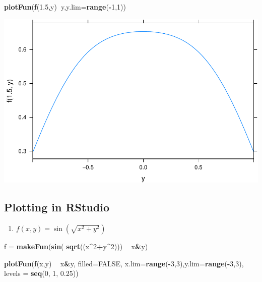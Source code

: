 \documentclass[
]{book}
\newenvironment{Shaded}{\begin{snugshade}}{\end{snugshade}}
\newcommand{\DataTypeTok}[1]{\textcolor[rgb]{0.13,0.29,0.53}{#1}}
\newcommand{\DecValTok}[1]{\textcolor[rgb]{0.00,0.00,0.81}{#1}}
\newcommand{\FloatTok}[1]{\textcolor[rgb]{0.00,0.00,0.81}{#1}}
\newcommand{\KeywordTok}[1]{\textcolor[rgb]{0.13,0.29,0.53}{\textbf{#1}}}
\newcommand{\NormalTok}[1]{#1}
\newcommand{\OperatorTok}[1]{\textcolor[rgb]{0.81,0.36,0.00}{\textbf{#1}}}
\newcommand{\OtherTok}[1]{\textcolor[rgb]{0.56,0.35,0.01}{#1}}
\newcommand{\StringTok}[1]{\textcolor[rgb]{0.31,0.60,0.02}{#1}}
\providecommand{\tightlist}{%
  \setlength{\itemsep}{0pt}\setlength{\parskip}{0pt}}
\begin{document}
\begin{Shaded}
\begin{Highlighting}[]
\KeywordTok{plotFun}\NormalTok{(}\KeywordTok{f}\NormalTok{(}\FloatTok{1.5}\NormalTok{,y)}\OperatorTok{~}\NormalTok{y,}\DataTypeTok{y.lim=}\KeywordTok{range}\NormalTok{(}\OperatorTok{-}\DecValTok{1}\NormalTok{,}\DecValTok{1}\NormalTok{))}
\end{Highlighting}
\end{Shaded}

\includegraphics{_bookdown_files/math135_handbook_files/figure-latex/unnamed-chunk-80-3.pdf}

\hypertarget{plotting-in-rstudio-2}{%
\subsection{Plotting in RStudio}\label{plotting-in-rstudio-2}}

\begin{enumerate}
\def\labelenumi{\arabic{enumi}.}
\tightlist
\item
  \(f(x,y) = \sin(\sqrt{x^2+y^2})\)
\end{enumerate}

\begin{Shaded}
\begin{Highlighting}[]
\NormalTok{f =}\StringTok{ }\KeywordTok{makeFun}\NormalTok{(}\KeywordTok{sin}\NormalTok{( }\KeywordTok{sqrt}\NormalTok{((x}\OperatorTok{^}\DecValTok{2}\OperatorTok{+}\NormalTok{y}\OperatorTok{^}\DecValTok{2}\NormalTok{))) }\OperatorTok{~}\StringTok{ }\NormalTok{x}\OperatorTok{&}\NormalTok{y)}

\KeywordTok{plotFun}\NormalTok{(}\KeywordTok{f}\NormalTok{(x,y) }\OperatorTok{~}\StringTok{ }\NormalTok{x}\OperatorTok{&}\NormalTok{y, }\DataTypeTok{filled=}\OtherTok{FALSE}\NormalTok{, }\DataTypeTok{x.lim=}\KeywordTok{range}\NormalTok{(}\OperatorTok{-}\DecValTok{3}\NormalTok{,}\DecValTok{3}\NormalTok{),}\DataTypeTok{y.lim=}\KeywordTok{range}\NormalTok{(}\OperatorTok{-}\DecValTok{3}\NormalTok{,}\DecValTok{3}\NormalTok{), }\DataTypeTok{levels =} \KeywordTok{seq}\NormalTok{(}\DecValTok{0}\NormalTok{, }\DecValTok{1}\NormalTok{, }\FloatTok{0.25}\NormalTok{))}
\end{Highlighting}
\end{Shaded}
\end{document}
